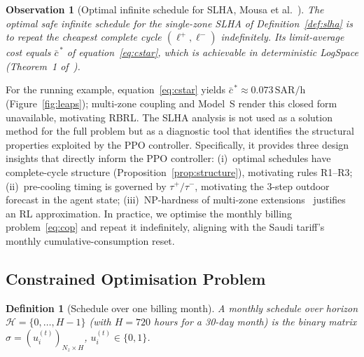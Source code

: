 \documentclass[3p,number]{elsarticle}
\let\oldsubsection\subsection
\renewcommand{\subsection}{\FloatBarrier\oldsubsection}
\newtheorem{definition}{Definition} \newtheorem{proposition}{Proposition} \newtheorem{remark}{Remark} \newtheorem{observation}{Observation}
\newcommand{\sched}{\sigma}
\newcommand{\SAR}{\text{SAR}}
\newcommand{\taup}{\tau^{+}}
\newcommand{\taum}{\tau^{-}}
\begin{document}
\begin{observation}[Optimal infinite schedule for SLHA, Mousa et al.~\cite{Mousa2016}]
\label{obs:optimal}
The optimal safe infinite schedule for the single-zone SLHA of
Definition~\ref{def:slha} is to repeat the cheapest complete cycle
$(\ell^+,\ell^-)$ indefinitely.
Its limit-average cost equals $\bar{c}^{\,*}$ of equation~\eqref{eq:cstar},
which is achievable in deterministic LogSpace (Theorem~1 of~\cite{Mousa2016}).
\end{observation}
 
For the running example, equation~\eqref{eq:cstar} yields $\bar{c}^{\,*}\approx0.073\,\SAR/\text{h}$ (Figure~\ref{fig:leaps}); multi-zone coupling and Model~S render this closed form unavailable, motivating RBRL.
The SLHA analysis is not used as a solution method for the full problem but as a diagnostic tool that identifies the structural properties exploited by the PPO controller.
Specifically, it provides three design insights that directly inform the PPO controller: (i)~optimal schedules have complete-cycle structure (Proposition~\ref{prop:structure}), motivating rules R1--R3; (ii)~pre-cooling timing is governed by $\taup/\taum$, motivating the 3-step outdoor forecast in the agent state; (iii)~NP-hardness of multi-zone extensions~\cite{Mousa2017} justifies an RL approximation.
In practice, we optimise the monthly billing problem~\eqref{eq:cop} and repeat it indefinitely, aligning with the Saudi tariff's monthly cumulative-consumption reset.
 
\subsection{Constrained Optimisation Problem}
\label{subsec:cop}
 
\begin{definition}[Schedule over one billing month]
\label{def:schedule}
A \emph{monthly schedule} over horizon $\mathcal{H}=\{0,\ldots,H-1\}$
(with $H=720$ hours for a 30-day month) is the binary matrix
$\sched=(u_i^{(t)})_{N_z\times H}$, $u_i^{(t)}\in\{0,1\}$.
\end{definition}
 
\end{document}

